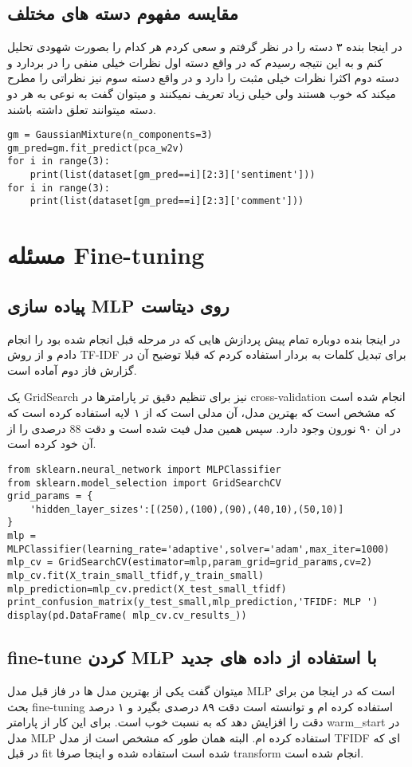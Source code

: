 \documentclass{article}[12pt]
\begin{document}
\subsection{مقایسه مفهوم دسته های مختلف }

در اینجا بنده ۳ دسته را در نظر گرفتم و سعی کردم هر کدام را بصورت شهودی تحلیل کنم و به این نتیجه رسیدم که در واقع دسته اول نظرات خیلی منفی را در بردارد و دسته دوم اکثرا نظرات خیلی مثبت را دارد و در واقع دسته سوم نیز نظراتی را مطرح میکند که خوب هستند ولی خیلی زیاد تعریف نمیکنند و میتوان گفت به نوعی به هر دو دسته میتوانند تعلق داشته باشند. 

\begin{verbatim}
gm = GaussianMixture(n_components=3)
gm_pred=gm.fit_predict(pca_w2v)
for i in range(3):
    print(list(dataset[gm_pred==i][2:3]['sentiment']))
for i in range(3):
    print(list(dataset[gm_pred==i][2:3]['comment']))
\end{verbatim}
\clearpage
\section{مسئله Fine-tuning}

\subsection{پیاده سازی MLP روی دیتاست}
در اینجا بنده دوباره تمام پیش پردازش هایی که در مرحله قبل انجام شده بود را انجام دادم و از روش TF-IDF برای تبدیل کلمات به بردار استفاده کردم که قبلا توضیح آن در گزارش فاز دوم آماده است. 

یک GridSearch نیز برای تنظیم دقیق تر پارامترها در cross-validation انجام شده است که مشخص است که بهترین مدل، آن مدلی است که از ۱ لایه استفاده کرده است که در ان ۹۰ نورون وجود دارد. 
سپس همین مدل فیت شده است و دقت 88 درصدی را از آن خود کرده است.
\begin{verbatim}
from sklearn.neural_network import MLPClassifier
from sklearn.model_selection import GridSearchCV
grid_params = {
    'hidden_layer_sizes':[(250),(100),(90),(40,10),(50,10)]
}
mlp = MLPClassifier(learning_rate='adaptive',solver='adam',max_iter=1000)
mlp_cv = GridSearchCV(estimator=mlp,param_grid=grid_params,cv=2)
mlp_cv.fit(X_train_small_tfidf,y_train_small)
mlp_prediction=mlp_cv.predict(X_test_small_tfidf)
print_confusion_matrix(y_test_small,mlp_prediction,'TFIDF: MLP ')
display(pd.DataFrame( mlp_cv.cv_results_))
\end{verbatim}
\subsection{fine-tune کردن MLP با استفاده از داده های جدید}
 میتوان گفت یکی از بهترین مدل ها در فاز قبل مدل MLP است که در اینجا من برای بحث fine-tuning استفاده کرده ام و توانسته است 
دقت ۸۹ درصدی بگیرد و ۱ درصد دقت را افزایش دهد که به نسبت خوب است. برای این کار از پارامتر warm\_start در مدل MLP استفاده کرده ام. 
البته همان طور که مشخص است از مدل TFIDF ای که در قبل fit شده است استفاده شده و اینجا صرفا transform انجام شده است. 
\end{document}
